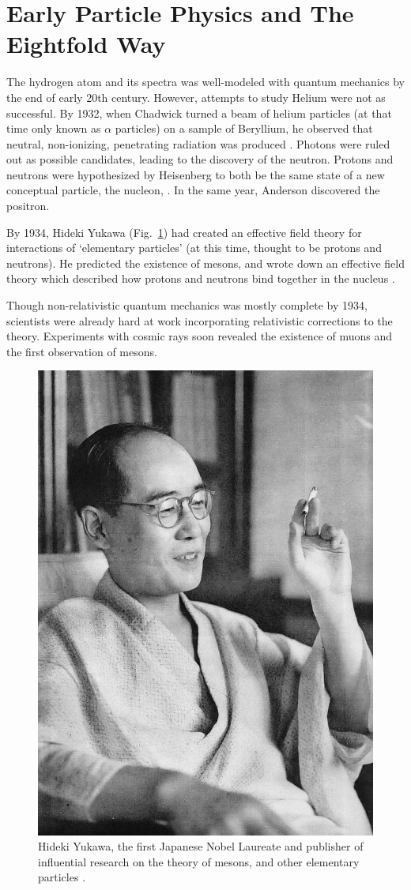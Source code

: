 \clearpage
\section{Early Particle Physics and The Eightfold Way}

The hydrogen atom and its spectra was well-modeled with quantum mechanics by the
end of early 20th century. However, attempts to study Helium were not as
successful. By 1932, when Chadwick turned a beam of helium particles (at that
time only known as $\alpha$ particles) on a sample of Beryllium, he observed
that neutral, non-ionizing, penetrating radiation was produced
\cite{Krauss2015}.  Photons were ruled out as possible candidates, leading to
the discovery of the neutron. Protons and neutrons were hypothesized by
Heisenberg to both be the same state of a new conceptual particle, the nucleon,
\cite{Heisenberg1952}. In the same year, Anderson discovered the positron. 

By 1934, Hideki Yukawa (Fig.~\ref{fig:hidekiyukawa}) had created an effective
field theory for interactions of `elementary particles' (at this time, thought
to be protons and neutrons). He predicted the existence of mesons, and wrote
down an effective field theory which described how protons and neutrons bind
together in the nucleus \cite{Yukawa1935}. 

Though non-relativistic quantum mechanics was mostly complete by 1934,
scientists were already hard at work incorporating relativistic corrections to
the theory. Experiments with cosmic rays soon revealed the existence of muons
and the first observation of mesons.

\begin{figure}[ht]
	\begin{center}
		\includegraphics[width=0.5\linewidth]{./figures/hidekiyukawa.jpg}
		\caption{
			Hideki Yukawa, the first Japanese Nobel Laureate and publisher of
			influential research on the theory of mesons, and other elementary
			particles  \cite{YukawaPhoto1952}.
		}
		\label{fig:hidekiyukawa}
	\end{center}
\end{figure}

